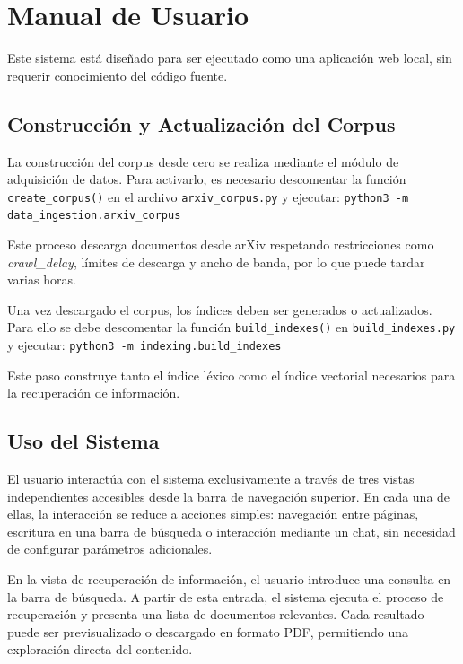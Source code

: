 \documentclass[runningheads]{llncs}
\begin{document}
\section{Manual de Usuario}

Este sistema está diseñado para ser ejecutado como una aplicación web local, 
sin requerir conocimiento del código fuente. 

\subsection{Construcción y Actualización del Corpus}

La construcción del corpus desde cero se realiza mediante el módulo de adquisición de datos. 
Para activarlo, es necesario descomentar la función \texttt{create\_corpus()} en el archivo \texttt{arxiv\_corpus.py} 
y ejecutar: \texttt{python3 -m data\_ingestion.arxiv\_corpus}

Este proceso descarga documentos desde arXiv respetando restricciones como \textit{crawl\_delay}, 
límites de descarga y ancho de banda, por lo que puede tardar varias horas.

Una vez descargado el corpus, los índices deben ser generados o actualizados. 
Para ello se debe descomentar la función \texttt{build\_indexes()} en \texttt{build\_indexes.py} 
y ejecutar: \texttt{python3 -m indexing.build\_indexes}

Este paso construye tanto el índice léxico como el índice vectorial necesarios para la recuperación de información.

\subsection{Uso del Sistema}

El usuario interactúa con el sistema exclusivamente a través de 
tres vistas independientes accesibles desde la barra de navegación superior. 
En cada una de ellas, la interacción se reduce a acciones simples: 
navegación entre páginas, escritura en una barra de búsqueda o interacción mediante un chat, 
sin necesidad de configurar parámetros adicionales.

En la vista de recuperación de información, el usuario introduce una consulta en la barra de búsqueda. 
A partir de esta entrada, el sistema ejecuta el proceso de recuperación y presenta una lista de documentos relevantes. 
Cada resultado puede ser previsualizado o descargado en formato PDF, permitiendo una exploración directa del contenido.
\end{document}
